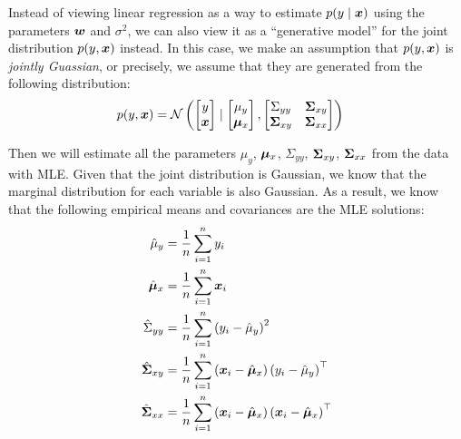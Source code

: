 \documentclass[letterpaper,12pt]{article}
\theoremstyle{plain}
\theoremstyle{definition}
\theoremstyle{remark}
\begin{document}
Instead of viewing linear regression as a way to estimate $p(y \mid {\bm{x}})$ using the parameters ${\bm{w}}$ and $\sigma^2$, we can also view it as a ``generative model'' for the joint distribution $p(y, {\bm{x}})$ instead.
%
In this case, we make an assumption that $p(y, {\bm{x}})$ is \emph{jointly Guassian}, or precisely, we assume that they are generated from the following distribution:
\begin{align}
    p(y, {\bm{x}}) & = \mathcal{N} \left( \begin{bmatrix} y \\ {\bm{x}} \end{bmatrix} \mid \begin{bmatrix} \mu_y \\ {\bm{\mu}}_x \end{bmatrix}, \begin{bmatrix} \Sigma_{yy} & {\bm{\Sigma}}_{xy} \\ {\bm{\Sigma}}_{xy} & {\bm{\Sigma}}_{xx} \end{bmatrix} \right)
\end{align}

Then we will estimate all the parameters $\mu_y$, ${\bm{\mu}}_x$, $\Sigma_{yy}$, ${\bm{\Sigma}}_{xy}$, ${\bm{\Sigma}}_{xx}$ from the data with MLE.
%
Given that the joint distribution is Gaussian, we know that the marginal distribution for each variable is also Gaussian.
%
As a result, we know that the following empirical means and covariances are the MLE solutions:
\begin{align}
    \hat{\mu}_y        & = \frac{1}{n} \sum_{i=1}^n y_i                                                                          \\
    \hat{{\bm{\mu}}}_x       & = \frac{1}{n} \sum_{i=1}^n {\bm{x}}_i                                                                        \\
    \hat{\Sigma}_{yy}  & = \frac{1}{n} \sum_{i=1}^n \left( y_i - \hat{\mu}_y \right)^2                                           \\
    \hat{{\bm{\Sigma}}}_{xy} & = \frac{1}{n} \sum_{i=1}^n \left( {\bm{x}}_i - \hat{{\bm{\mu}}}_x \right) \left( y_i - \hat{\mu}_y \right)^\top    \\
    \hat{{\bm{\Sigma}}}_{xx} & = \frac{1}{n} \sum_{i=1}^n \left( {\bm{x}}_i - \hat{{\bm{\mu}}}_x \right) \left( {\bm{x}}_i - \hat{{\bm{\mu}}}_x \right)^\top
\end{align}
\end{document}

